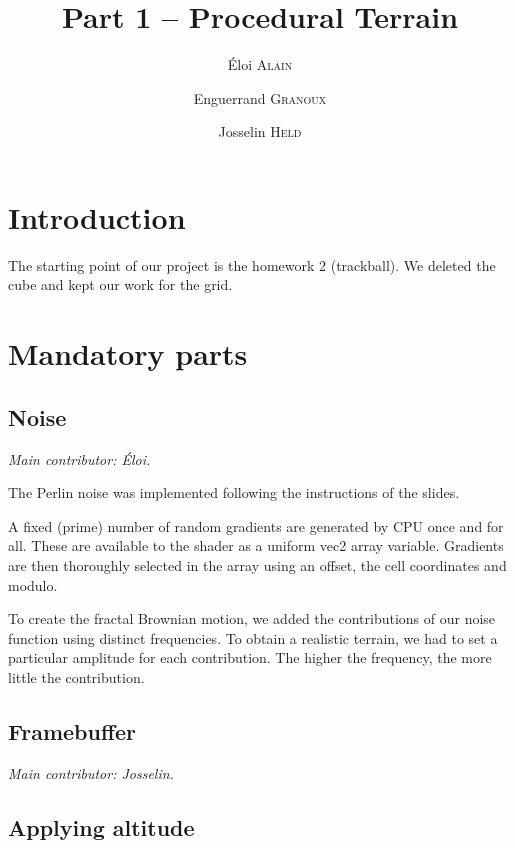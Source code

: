 \documentclass[12pt]{article}
\begin{document}
\title{Part 1 -- Procedural Terrain}
\author{Éloi \textsc{Alain} \and Enguerrand \textsc{Granoux} \and Josselin \textsc{Held}}
\date{}

\maketitle

\tableofcontents

\section{Introduction}

The starting point of our project is the homework 2 (trackball). We deleted the cube and kept our work for the grid.

\section{Mandatory parts}

\subsection{Noise}

{\it Main contributor: Éloi.}

The Perlin noise was implemented following the instructions of the slides.

A fixed (prime) number of random gradients are generated by CPU once and for all. These are available to the shader as a uniform vec2 array variable. Gradients are then thoroughly selected in the array using an offset, the cell coordinates and modulo.

To create the fractal Brownian motion, we added the contributions of our noise function using distinct frequencies. To obtain a realistic terrain, we had to set a particular amplitude for each contribution. The higher the frequency, the more little the contribution.

\subsection{Framebuffer}

{\it Main contributor: Josselin.}

\subsection{Applying altitude}
\end{document}
